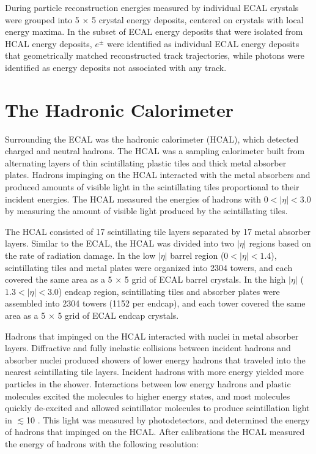During particle reconstruction energies measured by individual ECAL crystals were grouped into 5 $\times$ 5 crystal energy 
deposits, centered on crystals with local energy maxima.  In the subset of ECAL energy deposits that were isolated 
from HCAL energy deposits, $e^{\pm}$ were identified as individual ECAL energy deposits that geometrically matched 
reconstructed track trajectories, while photons were identified as energy deposits not associated with any track.

\section{The Hadronic Calorimeter}
\label{sec:hcalDescription}
Surrounding the ECAL was the hadronic calorimeter (HCAL), which detected charged and neutral hadrons.  The 
HCAL was a sampling calorimeter built from alternating layers of thin scintillating plastic tiles and thick 
metal absorber plates.  Hadrons impinging on the HCAL interacted with the metal absorbers and produced amounts 
of visible light in the scintillating tiles proportional to their incident energies.  The HCAL 
measured the energies of hadrons with $0 < |\eta| < 3.0$ by measuring the amount of visible light produced 
by the scintillating tiles.

The HCAL consisted of 17 scintillating tile layers separated by 17 metal absorber layers.  Similar to the ECAL, the 
HCAL was divided into two $|\eta|$ regions based on the rate of radiation damage.  In the low $|\eta|$ barrel 
region ($0 < |\eta| < 1.4$), scintillating tiles and metal plates were organized into 2304 towers, and each 
covered the same area as a 5 $\times$ 5 grid of 
ECAL barrel crystals.  In the high $|\eta|$ ($1.3 < |\eta| < 3.0$) endcap region, scintillating 
tiles and absorber plates were assembled into 2304 towers (1152 per endcap), and each tower covered the same area 
as a 5 $\times$ 5 grid of ECAL endcap crystals.

Hadrons that impinged on the HCAL interacted with nuclei in metal absorber layers.  Diffractive and fully 
inelastic collisions between incident hadrons and absorber nuclei produced showers of lower 
energy hadrons that traveled into the nearest scintillating tile layers.  Incident hadrons with more energy yielded 
more particles in the shower.  Interactions between low energy hadrons and plastic molecules excited the molecules to 
higher energy states, and most molecules quickly de-excited and allowed scintillator molecules to produce scintillation 
light in $\lesssim$10 \ns.  This light was measured by photodetectors, and determined the energy of hadrons 
that impinged on the HCAL.  After calibrations the HCAL measured the energy of hadrons with the following resolution:

